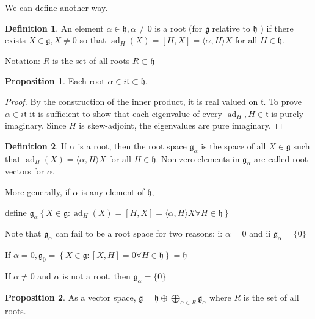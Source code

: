 \documentclass{article}
\theoremstyle{definition}
\newtheorem{definition}{Definition}
\newtheorem{proposition}{Proposition}
\newcommand{\ad}{\operatorname{ad}}
\begin{document}
We can define another way.

\begin{definition}
    An element \(\alpha \in \mathfrak{h} , \alpha \neq 0\) is a root (for \(\mathfrak{g} \) relative to \(\mathfrak{h} \) ) if there exists \(X\in \mathfrak{g} , X\neq 0\) so that \(\ad_H(X)=[H,X]= \langle \alpha ,H \rangle X\) for all \(H\in \mathfrak{h} \).
\end{definition}

Notation: \(R\) is the set of all roots \(R \subset \mathfrak{h} \)

\begin{proposition}
    Each root \(\alpha \in i \mathfrak{t} \subset \mathfrak{h} \).
\end{proposition}

\begin{proof}
    By the construction of the inner product, it is real valued on \(\mathfrak{t} \). To prove \(\alpha \in i \mathfrak{t} \) it is sufficient to show that each eigenvalue of every \(\ad_H, H\in \mathfrak{t}\) is purely imaginary. Since \(H\) is skew-adjoint, the eigenvalues are pure imaginary. 
\end{proof}

\begin{definition}
    If \(\alpha \) is a root, then the root space \(\mathfrak{g} _\alpha \) is the space of all \(X\in \mathfrak{g} \) such that \(\ad_H(X) = \langle \alpha ,H \rangle X\) for all \(H\in \mathfrak{h}\). Non-zero elements in \(\mathfrak{g} _\alpha \) are called root vectors for \(\alpha\).
    
    More generally, if \(\alpha\) is any element of \(\mathfrak{h}\),
    
    define \(\mathfrak{g}_\alpha \left\{ X\in \mathfrak{g} : \ad_H(X) = [H,X] = \langle \alpha , H \rangle X \forall H\in \mathfrak{h}  \right\} \)  

\end{definition}

Note that \(\mathfrak{g}_\alpha\) can fail to be a root space for two reasons: i: \(\alpha =0\) and ii \(\mathfrak{g}_\alpha =\{0\} \)  

If \(\alpha = 0, \mathfrak{g}_0 = \left\{ X\in \mathfrak{g}:[X,H]=0 \forall H\in \mathfrak{h}   \right\}  =\mathfrak{h} \) 

If \(\alpha \neq 0\) and \(\alpha \) is not a root, then \(\mathfrak{g}_\alpha =\{0\} \)   

\begin{proposition}
    As a vector space, \(\mathfrak{g}=\mathfrak{h}\oplus \bigoplus_{\alpha \in R}^{} \mathfrak{g}_\alpha\) where \(R\) is the set of all roots.
\end{proposition}
\end{document}

